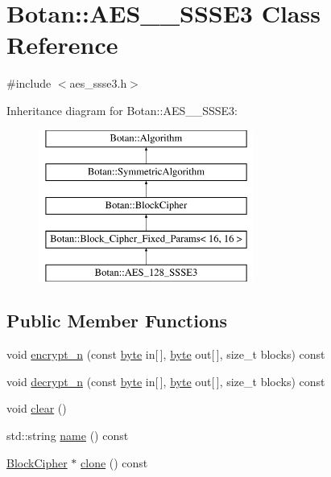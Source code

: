 \hypertarget{classBotan_1_1AES__128__SSSE3}{\section{Botan\-:\-:A\-E\-S\-\_\-\_\-\-S\-S\-S\-E3 Class Reference}
\label{classBotan_1_1AES__128__SSSE3}
}


{\ttfamily \#include $<$aes\-\_\-ssse3.\-h$>$}

Inheritance diagram for Botan\-:\-:A\-E\-S\-\_\-\_\-\-S\-S\-S\-E3\-:\begin{figure}[H]
\begin{center}
\leavevmode
\includegraphics[height=5.000000cm]{classBotan_1_1AES__128__SSSE3}
\end{center}
\end{figure}
\subsection*{Public Member Functions}
\begin{DoxyCompactItemize}
\item 
void \hyperlink{classBotan_1_1AES__128__SSSE3_a1d0fff34b2a21c37c7fc0a44e20fc3f5}{encrypt\-\_\-n} (const \hyperlink{namespaceBotan_a7d793989d801281df48c6b19616b8b84}{byte} in\mbox{[}$\,$\mbox{]}, \hyperlink{namespaceBotan_a7d793989d801281df48c6b19616b8b84}{byte} out\mbox{[}$\,$\mbox{]}, size\-\_\-t blocks) const 
\item 
void \hyperlink{classBotan_1_1AES__128__SSSE3_a5f060fb3169e32f84cfcc6078148b90f}{decrypt\-\_\-n} (const \hyperlink{namespaceBotan_a7d793989d801281df48c6b19616b8b84}{byte} in\mbox{[}$\,$\mbox{]}, \hyperlink{namespaceBotan_a7d793989d801281df48c6b19616b8b84}{byte} out\mbox{[}$\,$\mbox{]}, size\-\_\-t blocks) const 
\item 
void \hyperlink{classBotan_1_1AES__128__SSSE3_a134a5b164b82ea054500247f0771be42}{clear} ()
\item 
std\-::string \hyperlink{classBotan_1_1AES__128__SSSE3_a5a1103f9b41a511d0a6c276d10e90264}{name} () const 
\item 
\hyperlink{classBotan_1_1BlockCipher}{Block\-Cipher} $\ast$ \hyperlink{classBotan_1_1AES__128__SSSE3_a333e6a0c06ed48d32b19ba4de6b0e485}{clone} () const 
\end{DoxyCompactItemize}
